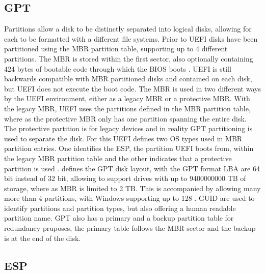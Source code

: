 \subsection{\acf{GPT}}

Partitions allow a disk to be distinctly separated into logical disks, allowing for each to be formatted with a different file systems.
Prior to \ac{UEFI} disks have been partitioned using the \ac{MBR} partition table, supporting up to 4 different partitions.
The \ac{MBR} is stored within the first sector, also optionally containing 424 bytes of bootable code through which the \ac{BIOS} boots \cite[Section 13.3.1]{uefi-spec}.
\ac{UEFI} is still backwards compatible with \ac{MBR} partitioned disks and contained on each disk, but \ac{UEFI} does not execute the boot code.
The \ac{MBR} is used in two different ways by the \ac{UEFI} environment, either as a legacy \ac{MBR} or a protective \ac{MBR}.
With the legacy \ac{MBR}, \ac{UEFI} uses the partitions defined in the \ac{MBR} partition table, where as the protective \ac{MBR} only has one partition spanning the entire disk.
The protective partition is for legacy devices and in reality \ac{GPT} partitioning is used to separate the disk.
For this \ac{UEFI} defines two \ac{OS} types used in \ac{MBR} partition entries.
One identifies the \ac{ESP}, the partition \ac{UEFI} boots from, within the legacy \ac{MBR} partition table and the other indicates that a protective partition is used \cite[Section 5]{uefi-spec}.
\cite[Section 5]{uefi-spec} defines the \ac{GPT} disk layout, with the \ac{GPT} format \ac{LBA} are 64 bit instead of 32 bit, allowing to support drives with up to 9400000000 \ac{TB} of storage, where as \ac{MBR} is limited to 2 \ac{TB}.
This is accompanied by allowing many more than 4 partitions, with Windows supporting up to 128 \cite{microsoft-windows-and-gpt-faq}.
\ac{GUID} are used to identify partitions and partition types, but also offering a human readable partition name.
\ac{GPT} also has a primary and a backup partition table for redundancy pruposes, the primary table follows the \ac{MBR} sector and the backup is at the end of the disk.

\subsection{\acf{ESP}}

